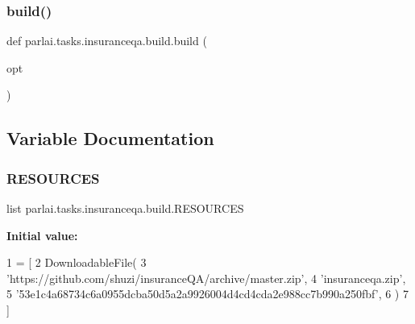 \subsubsection{\texorpdfstring{build()}{build()}}
{\footnotesize\ttfamily def parlai.\+tasks.\+insuranceqa.\+build.\+build (\begin{DoxyParamCaption}\item[{}]{opt }\end{DoxyParamCaption})}



\subsection{Variable Documentation}
\mbox{\label{namespaceparlai_1_1tasks_1_1insuranceqa_1_1build_ab0ec3ef6da60bb6f79d7345f2fe18985}} 
\subsubsection{\texorpdfstring{R\+E\+S\+O\+U\+R\+C\+ES}{RESOURCES}}
{\footnotesize\ttfamily list parlai.\+tasks.\+insuranceqa.\+build.\+R\+E\+S\+O\+U\+R\+C\+ES}

{\bfseries Initial value\+:}
\begin{DoxyCode}
1 =  [
2     DownloadableFile(
3         \textcolor{stringliteral}{'https://github.com/shuzi/insuranceQA/archive/master.zip'},
4         \textcolor{stringliteral}{'insuranceqa.zip'},
5         \textcolor{stringliteral}{'53e1c4a68734c6a0955dcba50d5a2a9926004d4cd4cda2e988cc7b990a250fbf'},
6     )
7 ]
\end{DoxyCode}

